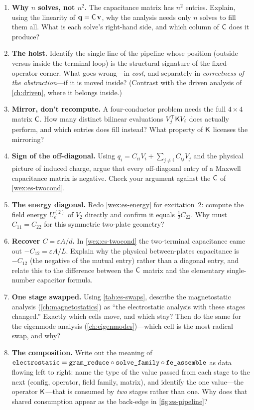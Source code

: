 \exercisessection
\begin{enumerate}[nosep]
  \item \textbf{Why $n$ solves, not $n^2$.} The capacitance matrix has $n^2$ entries.
  Explain, using the linearity of $\mathbf q=\mathsf{C}\,\mathbf v$, why the analysis
  needs only $n$ solves to fill them all. What is each solve's right-hand side, and
  which column of $\mathsf{C}$ does it produce?
  \item \textbf{The hoist.} Identify the single line of the pipeline whose position
  (outside versus inside the terminal loop) is the structural signature of the
  fixed-operator corner. What goes wrong---in \emph{cost}, and separately in
  \emph{correctness of the abstraction}---if it is moved inside? (Contrast with the
  driven analysis of \cref{ch:driven}, where it belongs inside.)
  \item \textbf{Mirror, don't recompute.} A four-conductor problem needs the full
  $4\times4$ matrix $\mathsf{C}$. How many distinct bilinear evaluations
  $V_j^{\!\top}\mathsf{K} V_i$ does  actually perform, and which entries
  does  fill instead? What property of $\mathsf{K}$ licenses the
  mirroring?
  \item \textbf{Sign of the off-diagonal.} Using $q_i=C_{ii}V_i+\sum_{j\neq
  i}C_{ij}V_j$ and the physical picture of induced charge, argue that every
  off-diagonal entry of a Maxwell capacitance matrix is negative. Check your argument
  against the $\mathsf{C}$ of \cref{wex:es-twocond}.
  \item \textbf{The energy diagonal.} Redo \cref{wex:es-energy} for excitation~2:
  compute the field energy $U_e^{(2)}$ of $V_2$ directly and confirm it equals
  $\tfrac12 C_{22}$. Why must $C_{11}=C_{22}$ for this symmetric two-plate geometry?
  \item \textbf{Recover $C=\varepsilon A/d$.} In \cref{wex:es-twocond} the
  two-terminal capacitance came out $-C_{12}=\varepsilon A/L$. Explain why the
  physical between-plates capacitance is $-C_{12}$ (the negative of the mutual entry)
  rather than a diagonal entry, and relate this to the difference between the
  $\mathsf{C}$ matrix and the elementary single-number capacitor formula.
  \item \textbf{One stage swapped.} Using \cref{tab:es-swaps}, describe the
  magnetostatic analysis (\cref{ch:magnetostatics}) as ``the electrostatic analysis
  with these stages changed.'' Exactly which cells move, and which stay? Then do the
  same for the eigenmode analysis (\cref{ch:eigenmodes})---which cell is the
  most radical swap, and why?
  \item \textbf{The composition.} Write out the meaning of
  $\texttt{electrostatic}=\texttt{gram\_reduce}\circ\texttt{solve\_family}\circ
  \texttt{fe\_assemble}$ as data flowing left to right: name the type of the value
  passed from each stage to the next (config, operator, field family, matrix), and
  identify the one value---the operator $\mathsf{K}$---that is consumed by \emph{two}
  stages rather than one. Why does that shared consumption appear as the back-edge in
  \cref{fig:es-pipeline}?
\end{enumerate}

